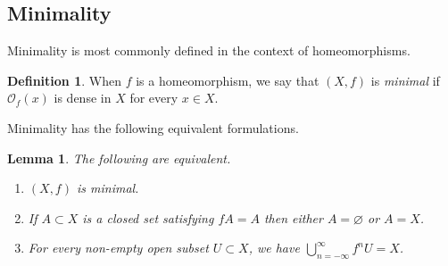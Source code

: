 \documentclass[12pt]{article}
\newtheorem{lemma}[theorem]{Lemma}
\theoremstyle{definition}
\newtheorem{definition}[theorem]{Definition}
\theoremstyle{remark}
\begin{document}
\subsection{Minimality}

Minimality is most commonly defined in the context of homeomorphisms.

\begin{definition}
When $f$ is a homeomorphism, we say that $(X,f)$ is {\it minimal} if
$\mathcal O_f(x)$ is dense in $X$ for every $x \in X$. 
\end{definition}




Minimality has the following equivalent formulations.

\begin{lemma} \label{equiv_to_minimal}
The following are equivalent.
\begin{enumerate}
\item[(1)]
$(X,f)$ is minimal.
\item[(2)]
If $A \subset X$ is a closed set satisfying $fA=A$ then either $A = \varnothing$ or $A=X$.
\item[(3)]
For every non-empty open subset $U \subset X$, we have
$\bigcup_{n =-\infty}^\infty f^nU=X$.
\end{enumerate}
\end{lemma}
\end{document}
